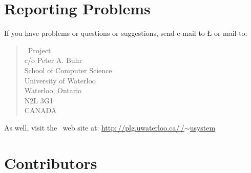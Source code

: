 \documentclass[openright,twoside]{report}
\begin{document}
\section{Reporting Problems}

If you have problems or questions or suggestions, send e-mail to \LGinlinetrue\LGbegin\lgrinde\L{}\endlgrinde\LGend{} or mail to:
\begin{quote}
\uS\ Project				\\
c/o Peter A. Buhr			\\
School of Computer Science	\\
University of Waterloo		\\
Waterloo, Ontario			\\
N2L 3G1						\\
CANADA						\\
\end{quote}
As well, visit the \uS\ web site at: \href{http://plg.uwaterloo.ca/~usystem}{\textsf{http:\,//\hspace{0.1ex}plg.uwaterloo.ca/\,/$\sim$usystem}}


\section{Contributors}
\end{document}

